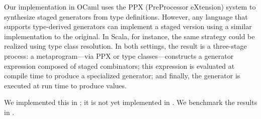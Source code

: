 \documentclass[acmsmall]{acmart}
\theoremstyle{definition}
\begin{document}
Our implementation in OCaml uses the PPX (PreProcessor eXtension) system to synthesize
staged generators from type definitions. However, any language that supports type-derived
generators can implement a staged version using a similar implementation to the original. In Scala,
for instance, the same strategy could be realized using type class
resolution. In both settings, the result is a three-stage process: a
metaprogram---via PPX or type classes---constructs a generator expression
composed of staged combinators; this expression is evaluated at compile
time to produce a specialized generator; and finally, the generator is
executed at run time to produce values.

We implemented this in \camlname; it is not yet implemented in \scalaname. We benchmark the results in .


\end{document}
